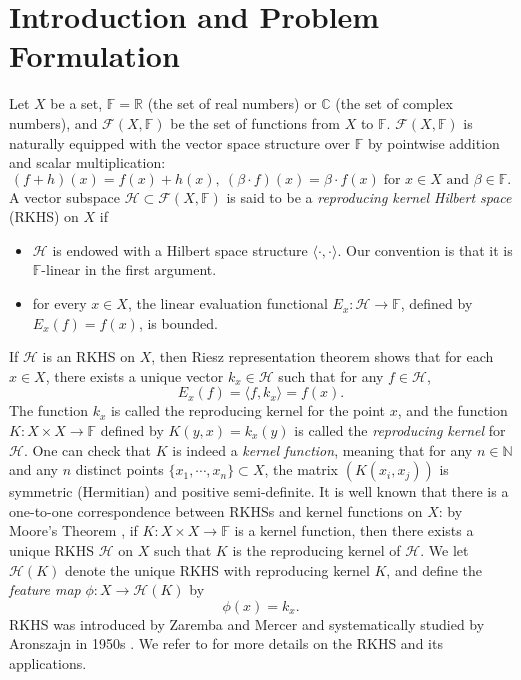 \documentclass{amsart}
\numberwithin{equation}{section}
\newcommand\N{{\mathbb N}}
\theoremstyle{plain}
\theoremstyle{remark}
\theoremstyle{definition}
\begin{document}
\section{Introduction and Problem Formulation}
Let $X$ be a set, $\mathbb{F} = \mathbb{R}$ (the set of real numbers) or $ \mathbb{C}$ (the set of complex numbers), and $\mathscr{F}(X,\mathbb{F})$ be the set of functions from $X$ to $\mathbb{F}$. 
$\mathscr{F}(X,\mathbb{F})$ is naturally equipped with the vector space structure over $\mathbb{F}$ by pointwise addition and scalar multiplication: 
\begin{equation*}
    (f+h)(x) = f(x) +h(x), \ (\beta \cdot f)(x) = \beta \cdot f(x) \;\text{for $x\in X$ and $\beta \in \mathbb{F}$}.
\end{equation*}
A vector subspace $\mathscr{H}\subset \mathscr{F}(X, \mathbb{F})$ is said to be a \textit{reproducing kernel Hilbert space} (RKHS) on $X$ if 
\begin{itemize}
    \item $\mathscr{H}$ is endowed with a Hilbert space structure $ \langle \cdot, \cdot \rangle$.
    Our convention is that it is $\mathbb{F}$-linear in the first argument. 
    \item for every $x \in X$, the linear evaluation functional $E_x: \mathscr{H} \rightarrow \mathbb{F} $, defined by $E_x(f)  =f(x)$, is bounded. 
\end{itemize}
If $\mathscr{H}$ is an RKHS on $X$, then Riesz representation theorem shows that for each $x \in X$, there exists a unique vector $k_x \in \mathscr{H}$ such that for any $f \in \mathscr{H}$, 
\begin{equation*}
    E_x(f)  = \langle f, k_x \rangle = f(x).
\end{equation*}
The function $k_x$ is called the reproducing kernel for the point $x$, and the function $K: X \times X \rightarrow \mathbb{F}$ defined by $K(y,x) = k_x(y)$ is called the \textit{reproducing kernel} for $\mathscr{H}$.
One can check that $K$ is indeed a \textit{kernel function}, meaning that for any $n\in \N$ and any $n$ distinct points $\{x_1, \cdots, x_n\} \subset X$, the matrix $(K(x_i,x_j))$ is symmetric (Hermitian) and positive semi-definite. 
It is well known that there is a one-to-one correspondence between RKHSs and kernel functions on $X$: by Moore's Theorem \cite{moore1general}, if $K: X \times X \rightarrow \mathbb{F}$ is a kernel function, then there exists a unique RKHS  $\mathscr{H}$ on $X$ such that $K$ is the reproducing kernel of $\mathscr{H}$.
We let $\mathscr{H}(K)$ denote the unique RKHS with reproducing kernel $K$, and define the \textit{feature map} $\phi: X \rightarrow \mathscr{H}(K)$ by $$\phi(x) = k_x.$$   RKHS was introduced by Zaremba \cite{zaremba1907lequation} and Mercer \cite{mercer1909xvi} and systematically studied by Aronszajn in 1950s \cite{aronszajn1950theory}.
We refer to \cite{ paulsen2016introduction, saitoh2016theory} for more details on the RKHS and its applications. 
\end{document}
